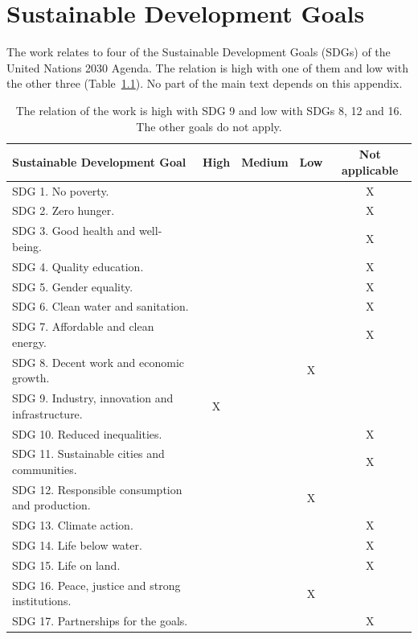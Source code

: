 \documentclass[11pt,english,listoffigures,listoftables]{tfgetsinf}
\begin{document}
\printbibliography[heading=bibintoc]


\APPENDIX


\chapter{Sustainable Development Goals}
\label{app:sdg}
The work relates to four of the Sustainable Development Goals (SDGs) of the United Nations 2030 Agenda. The relation is high with one of them and low with the other three (Table~\ref{tab:sdg}). No part of the main text depends on this appendix.

\begin{table}[H]
\centering
\small
\renewcommand{\arraystretch}{1.15}
\begin{tabular}{@{}lcccc@{}}
\toprule
\textbf{Sustainable Development Goal} & \textbf{High} & \textbf{Medium} & \textbf{Low} & \textbf{Not applicable} \\ \midrule
SDG 1. No poverty. & & & & X \\
SDG 2. Zero hunger. & & & & X \\
SDG 3. Good health and well-being. & & & & X \\
SDG 4. Quality education. & & & & X \\
SDG 5. Gender equality. & & & & X \\
SDG 6. Clean water and sanitation. & & & & X \\
SDG 7. Affordable and clean energy. & & & & X \\
SDG 8. Decent work and economic growth. & & & X & \\
SDG 9. Industry, innovation and infrastructure. & X & & & \\
SDG 10. Reduced inequalities. & & & & X \\
SDG 11. Sustainable cities and communities. & & & & X \\
SDG 12. Responsible consumption and production. & & & X & \\
SDG 13. Climate action. & & & & X \\
SDG 14. Life below water. & & & & X \\
SDG 15. Life on land. & & & & X \\
SDG 16. Peace, justice and strong institutions. & & & X & \\
SDG 17. Partnerships for the goals. & & & & X \\ \bottomrule
\end{tabular}
\caption[Relation of the work with the Sustainable Development Goals]{The relation of the work is high with SDG 9 and low with SDGs 8, 12 and 16. The other goals do not apply.}
\label{tab:sdg}
\end{table}
\end{document}
